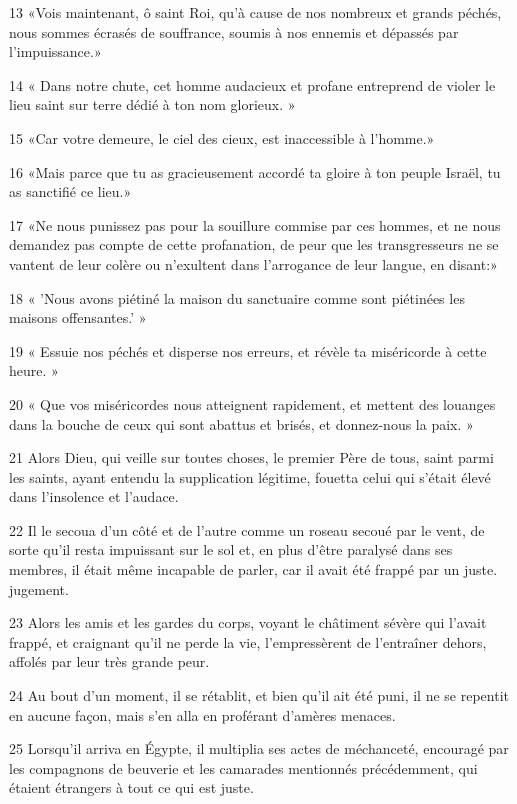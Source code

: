 \par 13 «Vois maintenant, ô saint Roi, qu'à cause de nos nombreux et grands péchés, nous sommes écrasés de souffrance, soumis à nos ennemis et dépassés par l'impuissance.»
\par 14 « Dans notre chute, cet homme audacieux et profane entreprend de violer le lieu saint sur terre dédié à ton nom glorieux. »
\par 15 «Car votre demeure, le ciel des cieux, est inaccessible à l'homme.»
\par 16 «Mais parce que tu as gracieusement accordé ta gloire à ton peuple Israël, tu as sanctifié ce lieu.»
\par 17 «Ne nous punissez pas pour la souillure commise par ces hommes, et ne nous demandez pas compte de cette profanation, de peur que les transgresseurs ne se vantent de leur colère ou n'exultent dans l'arrogance de leur langue, en disant:»
\par 18 « 'Nous avons piétiné la maison du sanctuaire comme sont piétinées les maisons offensantes.' »
\par 19 « Essuie nos péchés et disperse nos erreurs, et révèle ta miséricorde à cette heure. »
\par 20 « Que vos miséricordes nous atteignent rapidement, et mettent des louanges dans la bouche de ceux qui sont abattus et brisés, et donnez-nous la paix. »
\par 21 Alors Dieu, qui veille sur toutes choses, le premier Père de tous, saint parmi les saints, ayant entendu la supplication légitime, fouetta celui qui s'était élevé dans l'insolence et l'audace.
\par 22 Il le secoua d'un côté et de l'autre comme un roseau secoué par le vent, de sorte qu'il resta impuissant sur le sol et, en plus d'être paralysé dans ses membres, il était même incapable de parler, car il avait été frappé par un juste. jugement.
\par 23 Alors les amis et les gardes du corps, voyant le châtiment sévère qui l'avait frappé, et craignant qu'il ne perde la vie, l'empressèrent de l'entraîner dehors, affolés par leur très grande peur.
\par 24 Au bout d'un moment, il se rétablit, et bien qu'il ait été puni, il ne se repentit en aucune façon, mais s'en alla en proférant d'amères menaces.
\par 25 Lorsqu'il arriva en Égypte, il multiplia ses actes de méchanceté, encouragé par les compagnons de beuverie et les camarades mentionnés précédemment, qui étaient étrangers à tout ce qui est juste.
